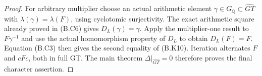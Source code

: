 \begin{proof}
For arbitrary multiplier choose an actual arithmetic element
$\gamma\in G_{\mathbb Q}\subset\widehat{GT}$ with
$\lambda(\gamma)=\lambda(F)$, using cyclotomic surjectivity.
The exact arithmetic square already proved in (B.C6) gives
$D_L(\gamma)=\gamma$.  Apply the multiplier-one result to
$F\gamma^{-1}$ and use the actual homomorphism property of
$D_L$ to obtain $D_L(F)=F$.  Equation (B.C3) then gives the
second equality of (B.K10).  Iteration alternates $F$ and
$cFc$, both in full GT.  The main theorem $\Delta|_{\widehat{GT}}=0$
therefore proves the final character assertion.
\end{proof}
